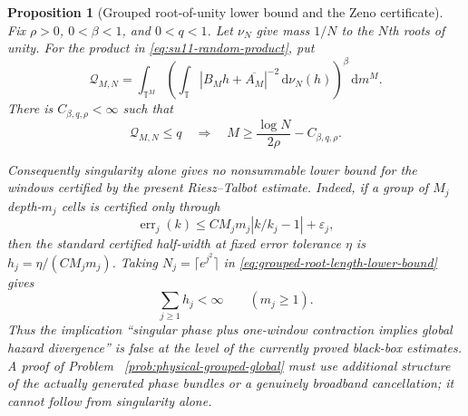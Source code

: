 \documentclass[11pt]{article}
\newtheorem{proposition}[theorem]{Proposition}
\theoremstyle{remark}
\newcommand{\T}{\mathbb T}
\newcommand{\dd}{\,\mathrm d}
\begin{document}
\begin{proposition}[Grouped root-of-unity lower bound and the Zeno certificate]
\label{prop:grouped-root-zeno}
Fix $\rho>0$, $0<\beta<1$, and $0<q<1$.  Let $\nu_N$ give mass $1/N$ to
the $N$th roots of unity.  For the product in
\eqref{eq:su11-random-product}, put
\begin{equation}
 \mathcal Q_{M,N}=
 \int_{\T^M}
 \left(
  \int_\T |B_Mh+\overline{A_M}|^{-2}\dd\nu_N(h)
 \right)^\beta\dd m^M.
 \label{eq:grouped-root-moment}
\end{equation}
There is $C_{\beta,q,\rho}<\infty$ such that
\begin{equation}
 \mathcal Q_{M,N}\leq q
 \quad\Longrightarrow\quad
 M\geq\frac{\log N}{2\rho}-C_{\beta,q,\rho}.
 \label{eq:grouped-root-length-lower-bound}
\end{equation}

Consequently singularity alone gives no nonsummable lower bound for the
windows certified by the present Riesz--Talbot estimate.  Indeed, if a group
of $M_j$ depth-$m_j$ cells is certified only through
\begin{equation}
 \operatorname{err}_j(k)
 \leq C M_jm_j|k/k_j-1|+\varepsilon_j,
 \label{eq:grouped-certified-chromatic-error}
\end{equation}
then the standard certified half-width at fixed error tolerance $\eta$ is
$h_j=\eta/(CM_jm_j)$.  Taking
$N_j=\lceil e^{j^2}\rceil$ in
\eqref{eq:grouped-root-length-lower-bound} gives
\begin{equation}
 \sum_{j\geq1}h_j<\infty
 \qquad(m_j\geq1).
 \label{eq:root-zeno-sum}
\end{equation}
Thus the implication ``singular phase plus one-window contraction implies
global hazard divergence'' is false at the level of the currently proved
black-box estimates.  A proof of Problem
~\ref{prob:physical-grouped-global} must use additional structure of the
actually generated phase bundles or a genuinely broadband cancellation; it
cannot follow from singularity alone.
\end{proposition}
\end{document}
